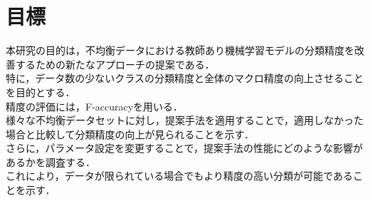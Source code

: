 \section{目標}

本研究の目的は，不均衡データにおける教師あり機械学習モデルの分類精度を改善するための新たなアプローチの提案である．\\
特に，データ数の少ないクラスの分類精度と全体のマクロ精度の向上させることを目的とする．\\
精度の評価には，F-accuracyを用いる．\\
様々な不均衡データセットに対し，提案手法を適用することで，適用しなかった場合と比較して分類精度の向上が見られることを示す．\\
さらに，パラメータ設定を変更することで，提案手法の性能にどのような影響があるかを調査する．\\
これにより，データが限られている場合でもより精度の高い分類が可能であることを示す．\\
